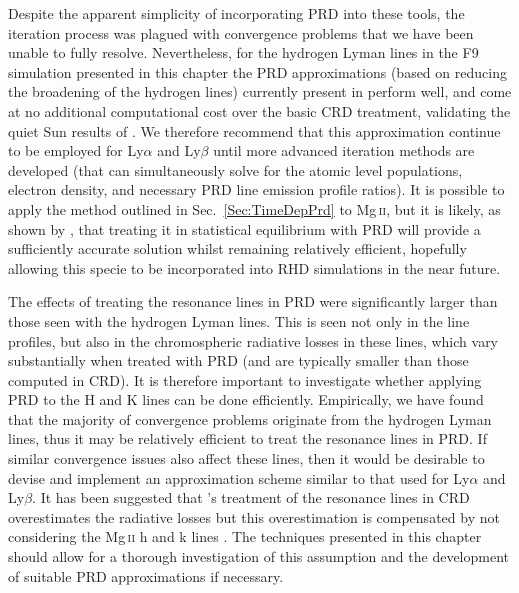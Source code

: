 Despite the apparent simplicity of incorporating PRD into these tools, the iteration process was plagued with convergence problems that we have been unable to fully resolve.
Nevertheless, for the hydrogen Lyman lines in the F9 simulation presented in this chapter the PRD approximations (based on reducing the broadening of the hydrogen lines) currently present in \Radyn{} perform well, and come at no additional computational cost over the basic CRD treatment, validating the quiet Sun results of \citet{Leenaarts2012a}.
We therefore recommend that this approximation continue to be employed for Ly$\alpha$ and Ly$\beta$ until more advanced iteration methods are developed (that can simultaneously solve for the atomic level populations, electron density, and necessary PRD line emission profile ratios).
It is possible to apply the method outlined in Sec.~\ref{Sec:TimeDepPrd} to Mg\,\textsc{ii}, but it is likely, as shown by \citet{Kerr2019}, that treating it in statistical equilibrium with PRD will provide a sufficiently accurate solution whilst remaining relatively efficient, hopefully allowing this specie to be incorporated into RHD simulations in the near future.

The effects of treating the \Caii{} resonance lines in PRD were significantly larger than those seen with the hydrogen Lyman lines.
This is seen not only in the line profiles, but also in the chromospheric radiative losses in these lines, which vary substantially when treated with PRD (and are typically smaller than those computed in CRD).
It is therefore important to investigate whether applying PRD to the H and K lines can be done efficiently.
Empirically, we have found that the majority of convergence problems originate from the hydrogen Lyman lines, thus it may be relatively efficient to treat the \Caii{} resonance lines in PRD.
If similar convergence issues also affect these lines, then it would be desirable to devise and implement an approximation scheme similar to that used for Ly$\alpha$ and Ly$\beta$.
It has been suggested that \Radyn{}'s treatment of the \Caii{} resonance lines in CRD overestimates the radiative losses but this overestimation is compensated by not considering the Mg\,\textsc{ii} h and k lines \citep[e.g.][]{Kerr2019a}.
The techniques presented in this chapter should allow for a thorough investigation of this assumption and the development of suitable PRD approximations if necessary.